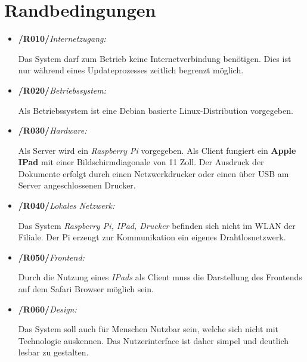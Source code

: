 \section{Randbedingungen}


\vspace{1cm}
\begin{itemize}
    \item \textbf{/R010/}\textit{Internetzugang:} \par
    Das System darf zum Betrieb keine Internetverbindung benötigen. Dies ist nur während eines Updateprozesses zeitlich begrenzt möglich.
    
    \item \textbf{/R020/}\textit{Betriebssystem:} \par
    Als Betriebssystem ist eine Debian basierte Linux-Distribution vorgegeben.
    
    \item \textbf{/R030/}\textit{Hardware:} \par
    Als Server wird ein \textit{Raspberry Pi} vorgegeben. Als Client fungiert ein \textbf{Apple IPad} mit einer Bildschirmdiagonale von 11 Zoll. Der Ausdruck der Dokumente erfolgt durch einen Netzwerkdrucker oder einen über USB am Server angeschlossenen Drucker.
    
    \item \textbf{/R040/}\textit{Lokales Netzwerk:} \par
    Das System \textit{Raspberry Pi, IPad, Drucker} befinden sich nicht im WLAN der Filiale. Der Pi erzeugt zur Kommunikation ein eigenes Drahtlosnetzwerk.
    
    \item \textbf{/R050/}\textit{Frontend:} \par
    Durch die Nutzung eines \textit{IPads} als Client muss die Darstellung des Frontends auf dem Safari Browser möglich sein.
    
    \item \textbf{/R060/}\textit{Design:} \par 
    Das System soll auch für Menschen Nutzbar sein, welche sich nicht mit Technologie auskennen. Das Nutzerinterface ist daher simpel und deutlich lesbar zu gestalten.
\end{itemize}

